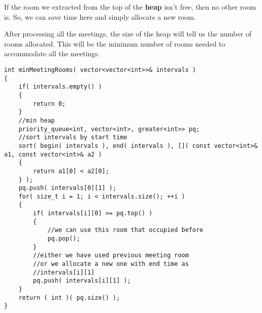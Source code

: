 If the room we extracted from the top of the \textbf{heap} isn't free, then no other room is. So, we can save time here and simply allocate a new room.

After processing all the meetings, the size of the heap will tell us the number of rooms allocated. This will be the minimum number of rooms needed to accommodate all the meetings.

\begin{lstlisting}[style=customc, caption={Min Heap}]
int minMeetingRooms( vector<vector<int>>& intervals )
{
    if( intervals.empty() )
    {
        return 0;
    }
    //min heap
    priority_queue<int, vector<int>, greater<int>> pq;
    //sort intervals by start time
    sort( begin( intervals ), end( intervals ), []( const vector<int>& a1, const vector<int>& a2 )
    {
        return a1[0] < a2[0];
    } );
    pq.push( intervals[0][1] );
    for( size_t i = 1; i < intervals.size(); ++i )
    {
        if( intervals[i][0] >= pq.top() )
        {
            //we can use this room that occupied before
            pq.pop();
        }
        //either we have used previous meeting room
        //or we allocate a new one with end time as
        //intervals[i][1]
        pq.push( intervals[i][1] );
    }
    return ( int )( pq.size() );
}
\end{lstlisting}